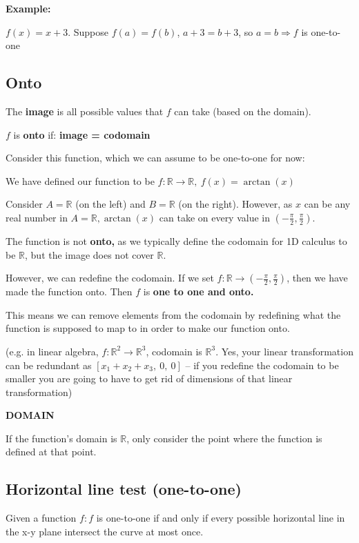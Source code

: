 \documentclass[
]{article}
\begin{document}
\textbf{Example:}

$f(x) = x + 3$. Suppose $f(a) = f(b)$, $a + 3 = b + 3$, so
$a = b \Rightarrow f$ is one-to-one


\subsection{Onto}

The \textbf{image} is all possible values that $f$ can take (based on
the domain).

$f$ is \textbf{onto} if: \textbf{image = codomain}

Consider this function, which we can assume to be one-to-one for now:

We have defined our function to be
$f\mathbb{:R \rightarrow R,\ }f(x) = \arctan(x)$

Consider $A\mathbb{= R}$ (on the left) and $B\mathbb{= R}$ (on the
right). However, as $x$ can be any real number in
$A\mathbb{= R,}\arctan(x)$ can take on every value in
$\left( - \frac{\pi}{2},\frac{\pi}{2} \right)$.

The function is not \textbf{onto,} as we typically define the codomain
for 1D calculus to be $\mathbb{R}$, but the image does not cover
$\mathbb{R}$.

However, we can redefine the codomain. If we set
$f\mathbb{:R \rightarrow}\left( - \frac{\pi}{2},\frac{\pi}{2} \right)$,
then we have made the function onto. Then $f$ is \textbf{one to one
and onto.}

This means we can remove elements from the codomain by redefining what
the function is supposed to map to in order to make our function onto.

(e.g. in linear algebra,
$f:\mathbb{R}^{2} \rightarrow \mathbb{R}^{3}$, codomain is
$\mathbb{R}^{3}$. Yes, your linear transformation can be redundant as
$\left\lbrack x_{1} + x_{2} + x_{3},\ 0,\ 0 \right\rbrack$ -- if you
redefine the codomain to be smaller you are going to have to get rid of
dimensions of that linear transformation)

\textbf{DOMAIN}

If the function's domain is $\mathbb{R}$, only consider the point
where the function is defined at that point.


\subsection{Horizontal line test
(one-to-one)}

Given a function $f:f$ is one-to-one if and only if every possible
horizontal line in the x-y plane intersect the curve at most once.
\end{document}
